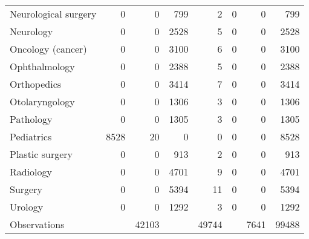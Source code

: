 \begin{tabular}{lrrrrrrr}
Neurological surgery&           0&           0&         799&           2&           0&           0&         799\\
Neurology           &           0&           0&        2528&           5&           0&           0&        2528\\
Oncology (cancer)   &           0&           0&        3100&           6&           0&           0&        3100\\
Ophthalmology       &           0&           0&        2388&           5&           0&           0&        2388\\
Orthopedics         &           0&           0&        3414&           7&           0&           0&        3414\\
Otolaryngology      &           0&           0&        1306&           3&           0&           0&        1306\\
Pathology           &           0&           0&        1305&           3&           0&           0&        1305\\
Pediatrics          &        8528&          20&           0&           0&           0&           0&        8528\\
Plastic surgery     &           0&           0&         913&           2&           0&           0&         913\\
Radiology           &           0&           0&        4701&           9&           0&           0&        4701\\
Surgery             &           0&           0&        5394&          11&           0&           0&        5394\\
Urology             &           0&           0&        1292&           3&           0&           0&        1292\\
\midrule Observations & & 42103 & & 49744 & & 7641 & 99488 \\ \bottomrule \end{tabular}
